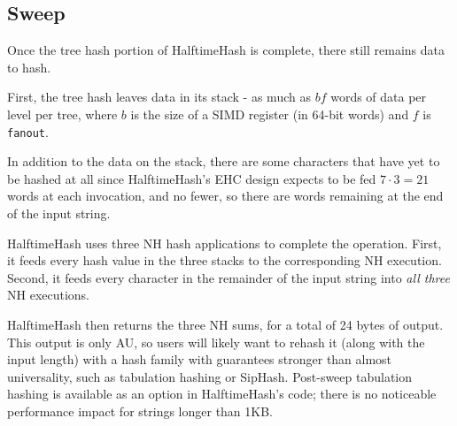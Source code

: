 \documentclass[sigconf, nonacm]{acmart}
\begin{document}




\subsection{Sweep}


Once the tree hash portion of HalftimeHash is complete, there still remains data to hash.

First, the tree hash leaves data in its stack - as much as $bf$ words of data per level per tree, where $b$ is the size of a SIMD register (in 64-bit words) and $f$ is \texttt{fanout}.

In addition to the data on the stack, there are some characters that have yet to be hashed at all since HalftimeHash's EHC design expects to be fed $7 \cdot 3 = 21$ words at each invocation, and no fewer, so there are words remaining at the end of the input string.

HalftimeHash uses three NH hash applications to complete the operation.
First, it feeds every hash value in the three stacks to the corresponding NH execution.
Second, it feeds every character in the remainder of the input string into {\em all three} NH executions.

HalftimeHash then returns the three NH sums, for a total of 24 bytes of output.
This output is only AU, so users will likely want to rehash it (along with the input length) with a hash family with guarantees stronger than almost universality, such as tabulation hashing or SipHash. \cite{tabulation,siphash}
Post-sweep tabulation hashing is available as an option in HalftimeHash's code; there is no noticeable performance impact for strings longer than 1KB.
\end{document}

